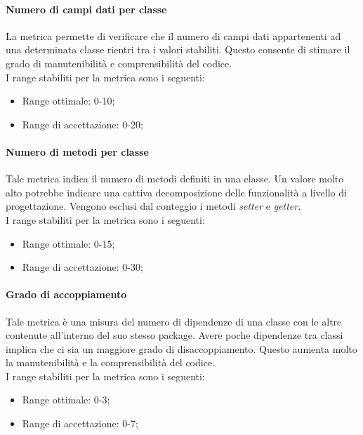 			\paragraph[Numero di campi dati per classe]{\hypertarget{ncdc}{Numero di campi dati per classe}}
			La metrica permette di verificare che il numero di campi dati appartenenti ad una determinata classe rientri tra i valori stabiliti. Questo consente di stimare il grado di manutenibilità e comprensibilità del codice.
			\\I range stabiliti per la metrica sono i seguenti:
			\begin{itemize}
				\item Range ottimale: 0-10;
				\item Range di accettazione: 0-20;
			\end{itemize}
			
			\paragraph[Numero di metodi per classe]{\hypertarget{nmc}{Numero di metodi per classe}}
			Tale metrica indica il numero di metodi definiti in una classe. Un valore molto alto potrebbe indicare una cattiva decomposizione delle funzionalità a livello di progettazione. Vengono esclusi dal conteggio i metodi \textit{setter} e \textit{getter}.
			\\I range stabiliti per la metrica sono i seguenti:
			\begin{itemize}
				\item Range ottimale: 0-15;
				\item Range di accettazione: 0-30;
			\end{itemize}
			
			\paragraph[Grado di accoppiamento]{\hypertarget{ga}{Grado di accoppiamento}}
			Tale metrica è una misura del numero di dipendenze di una classe con le altre contenute all'interno del suo stesso package. Avere poche dipendenze tra classi implica che ci sia un maggiore grado di disaccoppiamento. Questo aumenta molto la manutenibilità e la comprensibilità del codice.
			\\I range stabiliti per la metrica sono i seguenti:
			\begin{itemize}
				\item Range ottimale: 0-3;
				\item Range di accettazione: 0-7;
			\end{itemize}
			
